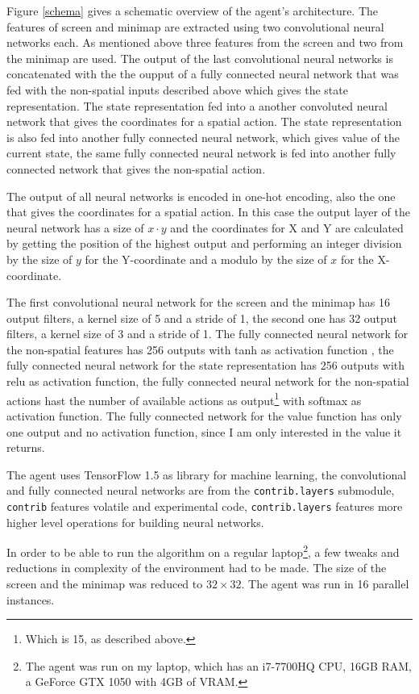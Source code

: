 \documentclass{article}
\begin{document}
Figure \ref{schema} gives a schematic overview of the agent's architecture. The 
features of screen and minimap are extracted using two convolutional neural 
networks each. As mentioned above three features from the screen and two from 
the minimap are used. The output of the last convolutional neural networks is 
concatenated with the the oupput of a fully connected neural network that was 
fed with the non-spatial inputs described above which gives the state 
representation. The state representation fed into a another convoluted neural 
network that gives the coordinates for a spatial action. The state 
representation is also fed into another fully connected neural network, which 
gives value of the current state, the same fully connected neural network is 
fed into another fully connected network that gives the non-spatial action.

The output of all neural networks is encoded in one-hot encoding, also the one 
that gives the coordinates for a spatial action. In this case the output layer 
of the neural network has a size of $x \cdot y$ and the coordinates for X and 
Y are calculated by getting the position of the highest output and performing 
an integer division by the size of $y$ for the Y-coordinate and a modulo by the 
size of $x$ for the X-coordinate.

The first convolutional neural network for the screen and the minimap has 16 
output filters, a kernel size of 5 and a stride of 1, the second one has 32 
output filters, a kernel size of 3 and a stride of 1. The fully connected 
neural network for the non-spatial features has 256 outputs with tanh as 
activation function	, the fully connected neural network for the state 
representation has 256 outputs with relu as activation function, the fully 
connected neural network for the non-spatial actions hast the number of 
available actions as output\footnote{Which is 15, as described above.} with 
softmax as activation function. The fully connected network for the value 
function has only one output and no activation function, since I am only 
interested in the value it returns.

The agent uses TensorFlow 1.5 as library for machine learning, the 
convolutional and fully connected neural networks are from the 
\texttt{contrib.layers} submodule, \texttt{contrib} features volatile and 
experimental code, \texttt{contrib.layers} features more higher level 
operations for building neural networks.

In order to be able to run the algorithm on a regular laptop\footnote{The agent 
was run on my laptop, which has an i7-7700HQ CPU, 16GB RAM, a GeForce GTX 1050 
with 4GB of VRAM.}, a few tweaks and reductions in complexity of the 
environment had to be made. The size of the screen and the minimap was reduced 
to $32 \times 32$. The agent was run in 16 parallel instances.
\end{document}
